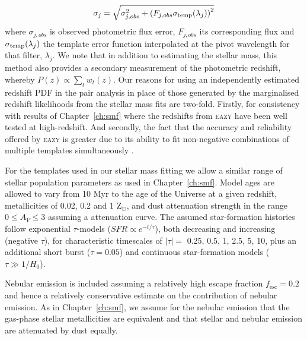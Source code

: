 \begin{equation}
	\sigma_{j} = \sqrt{\sigma_{j,obs}^{2} + \left ( F_{j,obs}\sigma_{\textup{temp}}(\lambda_{j}) \right )^{2} }
\end{equation}
where $\sigma_{j,obs}$ is observed photometric flux error, $F_{j,obs}$ its corresponding flux and $\sigma_{\textup{temp}}(\lambda_{j})$ the template error function interpolated at the pivot wavelength for that filter, $\lambda_{j}$. We note that in addition to estimating the stellar mass, this method also provides a secondary measurement of the photometric redshift, whereby \(P(z) \propto \sum_{t} w_{t}(z) \). Our reasons for using an independently estimated redshift PDF in the pair analysis in place of those generated by the marginalised redshift likelihoods from the stellar mass fits are two-fold. Firstly, for consistency with results of Chapter~\ref{ch:smf} where the redshifts from \textsc{eazy} have been well tested at high-redshift. And secondly, the fact that the accuracy and reliability offered by \textsc{eazy} is greater due to its ability to fit non-negative combinations of multiple templates simultaneously \citep{Brammer:2008gn,Dahlen:2013eu}.

For the \citet{Bruzual:2003ckb} templates used in our stellar mass fitting we allow a similar range of stellar population parameters as used in Chapter~\ref{ch:smf}. Model ages are allowed to vary from 10 Myr to the age of the Universe at a given redshift, metallicities of 0.02, 0.2 and 1 Z$_{\odot}$, and dust attenuation strength in the range $0 \le A_{V} \le 3$ assuming a \citet{2000ApJ...533..682C} attenuation curve. The assumed star-formation histories follow exponential $\tau$-models ($SFR \propto e^{-t/\tau}$), both decreasing and increasing (negative $\tau$), for characteristic timescales of $\left | \tau \right | = $ 0.25, 0.5, 1, 2.5, 5, 10, plus an additional short burst ($\tau = 0.05$) and continuous star-formation models ($\tau \gg1/H_{0}$). 

Nebular emission is included assuming a relatively high escape fraction $f_{\text{esc}} = 0.2$ \citep{Yajima:2010fb,Fernandez:2011cw,Finkelstein:2012hr,Robertson:2013ji} and hence a relatively conservative estimate on the contribution of nebular emission. As in Chapter~\ref{ch:smf}, we assume for the nebular emission that the gas-phase stellar metallicities are equivalent and that stellar and nebular emission are attenuated by dust equally.

